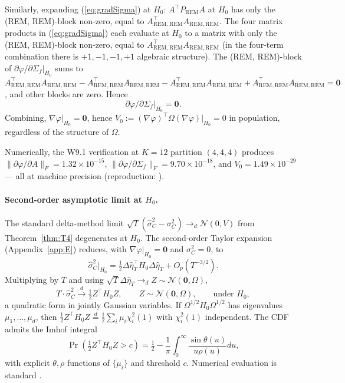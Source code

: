 \documentclass[11pt,letterpaper]{article}
\theoremstyle{remark}
\newcommand{\REM}{\mathrm{REM}}
\newcommand{\Sigmaf}{\Sigma_f}
\newcommand{\PREM}{P_{\REM}}
\newcommand{\sigC}{\sigma^2_C}
\newcommand{\hatsigC}{\widehat{\sigma}^2_C}
\begin{document}
Similarly, expanding (\ref{eq:gradSigma}) at $H_0$: $A^\top \PREM A$ at $H_0$ has only the (REM, REM)-block non-zero, equal to $A_{\REM, \REM}^\top A_{\REM, \REM}$. The four matrix products in (\ref{eq:gradSigma}) each evaluate at $H_0$ to a matrix with only the (REM, REM)-block non-zero, equal to $A_{\REM, \REM}^\top A_{\REM, \REM}$ (in the four-term combination there is $+1, -1, -1, +1$ algebraic structure). The (REM, REM)-block of $\partial \varphi / \partial \Sigmaf|_{H_0}$ sums to $A_{\REM, \REM}^\top A_{\REM, \REM} - A_{\REM, \REM}^\top A_{\REM, \REM} - A_{\REM, \REM}^\top A_{\REM, \REM} + A_{\REM, \REM}^\top A_{\REM, \REM} = \mathbf{0}$, and other blocks are zero. Hence
\begin{equation*}
\partial \varphi / \partial \Sigmaf \big|_{H_0} = \mathbf{0}.
\end{equation*}
Combining, $\nabla \varphi |_{H_0} = \mathbf{0}$, hence $V_0 := (\nabla \varphi)^\top \Omega (\nabla \varphi) |_{H_0} = 0$ in population, regardless of the structure of $\Omega$.

Numerically, the W9.1 verification at $K = 12$ partition $(4, 4, 4)$ produces $\|\partial \varphi / \partial A\|_F = 1.32 \times 10^{-15}$, $\|\partial \varphi / \partial \Sigmaf\|_F = 9.70 \times 10^{-18}$, and $V_0 = 1.49 \times 10^{-29}$ --- all at machine precision (reproduction: ).

\paragraph{Second-order asymptotic limit at $H_0$.} The standard delta-method limit $\sqrt{T}(\hatsigC - \sigC) \to_d \mathcal{N}(0, V)$ from Theorem~\ref{thm:T4} degenerates at $H_0$. The second-order Taylor expansion (Appendix~\ref{app:E}) reduces, with $\nabla \varphi|_{H_0} = \mathbf{0}$ and $\sigC = 0$, to
\begin{equation*}
\hatsigC \big|_{H_0} = \tfrac{1}{2} \Delta \widehat\eta_T^\top H_0 \Delta \widehat\eta_T + O_p(T^{-3/2}).
\end{equation*}
Multiplying by $T$ and using $\sqrt{T} \Delta \widehat\eta_T \to_d Z \sim \mathcal{N}(\mathbf{0}, \Omega)$,
\begin{equation*}
T \cdot \hatsigC \xrightarrow{d} \tfrac{1}{2} Z^\top H_0 Z, \qquad Z \sim \mathcal{N}(\mathbf{0}, \Omega), \qquad \text{under } H_0,
\end{equation*}
a quadratic form in jointly Gaussian variables. If $\Omega^{1/2} H_0 \Omega^{1/2}$ has eigenvalues $\mu_1, \ldots, \mu_d$, then $\tfrac{1}{2} Z^\top H_0 Z \stackrel{d}{=} \tfrac{1}{2} \sum_i \mu_i \chi^2_i(1)$ with $\chi^2_i(1)$ independent. The CDF admits the Imhof \cite{Imhof1961} integral
\begin{equation*}
\Pr\!\left(\tfrac{1}{2} Z^\top H_0 Z > c\right) = \tfrac{1}{2} - \frac{1}{\pi} \int_0^\infty \frac{\sin \theta(u)}{u \rho(u)} du,
\end{equation*}
with explicit $\theta, \rho$ functions of $\{\mu_i\}$ and threshold $c$. Numerical evaluation is standard \cite{Davies1980}.
\end{document}
